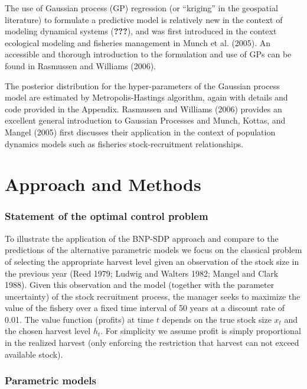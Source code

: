 \documentclass[author-year, review]{elsarticle} %
\begin{document}
The use of Gaussian process (GP) regression (or ``kriging'' in the
geospatial literature) to formulate a predictive model is relatively new
in the context of modeling dynamical systems ({\textbf{???}}), and was
first introduced in the context ecological modeling and fisheries
management in Munch et al. (2005). An accessible and thorough
introduction to the formulation and use of GPs can be found in Rasmussen
and Williams (2006).

The posterior distribution for the hyper-parameters of the Gaussian
process model are estimated by Metropolis-Hastings algorithm, again with
details and code provided in the Appendix. Rasmussen and Williams (2006)
provides an excellent general introduction to Gaussian Processes and
Munch, Kottas, and Mangel (2005) first discusses their application in
the context of population dynamics models such as fisheries
stock-recruitment relationships.

\section{Approach and Methods}\label{approach-and-methods}

\subsubsection{Statement of the optimal control
problem}\label{statement-of-the-optimal-control-problem}

To illustrate the application of the BNP-SDP approach and compare to the
predictions of the alternative parametric models we focus on the
classical problem of selecting the appropriate harvest level given an
observation of the stock size in the previous year (Reed 1979; Ludwig
and Walters 1982; Mangel and Clark 1988). Given this observation and the
model (together with the parameter uncertainty) of the stock recruitment
process, the manager seeks to maximize the value of the fishery over a
fixed time interval of 50 years at a discount rate of 0.01. The value
function (profits) at time $t$ depends on the true stock size $x_t$ and
the chosen harvest level $h_t$. For simplicity we assume profit is
simply proportional in the realized harvest (only enforcing the
restriction that harvest can not exceed available stock).

\subsubsection{Parametric models}\label{parametric-models}
\end{document}
